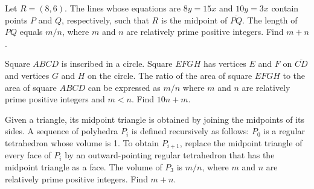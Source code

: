 %	













\begin{question}[name={2001 AIME II, \href{https://artofproblemsolving.com/community/c4p714296}{Problem 4}}]
	Let $R=(8,6)$. The lines whose equations are $8y=15x$ and $10y=3x$ contain points $P$ and $Q$, respectively, such that $R$ is the midpoint of $\overline{PQ}$. The length of $PQ$ equals ${m}/{n}$, where $m$ and $n$ are relatively prime positive integers. Find $m+n$.
\end{question}


%	












\begin{question}[name={2001 AIME II, \href{https://artofproblemsolving.com/community/c4p714300}{Problem 6}}]
	Square $ABCD$ is inscribed in a circle. Square $EFGH$ has vertices $E$ and $F$ on $\overline{CD}$ and vertices $G$ and $H$ on the circle. The ratio of the area of square $EFGH$ to the area of square $ABCD$ can be expressed as ${m}/{n}$ where $m$ and $n$ are relatively prime positive integers and $m<n$. Find $10n+m$.	
\end{question}


%	








\begin{question}[name={2001 AIME II, \href{https://artofproblemsolving.com/community/c4p714309}{Problem 12}}]
	Given a triangle, its midpoint triangle is obtained by joining the midpoints of its sides. A sequence of polyhedra $P_{i}$ is defined recursively as follows: $P_{0}$ is a regular tetrahedron whose volume is 1. To obtain $P_{i+1}$, replace the midpoint triangle of every face of $P_{i}$ by an outward-pointing regular tetrahedron that has the midpoint triangle as a face. The volume of $P_{3}$ is ${m}/{n}$, where $m$ and $n$ are relatively prime positive integers. Find $m+n$.	
	
\end{question}


